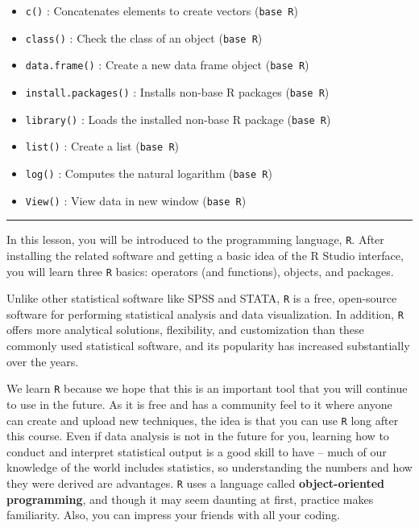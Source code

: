 \documentclass[
]{book}
\providecommand{\tightlist}{%
  \setlength{\itemsep}{0pt}\setlength{\parskip}{0pt}}
\begin{document}
\begin{itemize}
\tightlist
\item
  \texttt{c()} : Concatenates elements to create vectors (\texttt{base\ R})
\item
  \texttt{class()} : Check the class of an object (\texttt{base\ R})
\item
  \texttt{data.frame()} : Create a new data frame object (\texttt{base\ R})
\item
  \texttt{install.packages()} : Installs non-base R packages (\texttt{base\ R})
\item
  \texttt{library()} : Loads the installed non-base R package (\texttt{base\ R})
\item
  \texttt{list()} : Create a list (\texttt{base\ R})
\item
  \texttt{log()} : Computes the natural logarithm (\texttt{base\ R})
\item
  \texttt{View()} : View data in new window (\texttt{base\ R})
\end{itemize}

\begin{center}\rule{0.5\linewidth}{0.5pt}\end{center}

In this lesson, you will be introduced to the programming language, \texttt{R}. After installing the related software and getting a basic idea of the R Studio interface, you will learn three \texttt{R} basics: operators (and functions), objects, and packages.

Unlike other statistical software like SPSS and STATA, \texttt{R} is a free, open-source software for performing statistical analysis and data visualization. In addition, \texttt{R} offers more analytical solutions, flexibility, and customization than these commonly used statistical software, and its popularity has increased substantially over the years.

We learn \texttt{R} because we hope that this is an important tool that you will continue to use in the future. As it is free and has a community feel to it where anyone can create and upload new techniques, the idea is that you can use \texttt{R} long after this course. Even if data analysis is not in the future for you, learning how to conduct and interpret statistical output is a good skill to have -- much of our knowledge of the world includes statistics, so understanding the numbers and how they were derived are advantages. \texttt{R} uses a language called \textbf{object-oriented programming}, and though it may seem daunting at first, practice makes familiarity. Also, you can impress your friends with all your coding.
\end{document}
